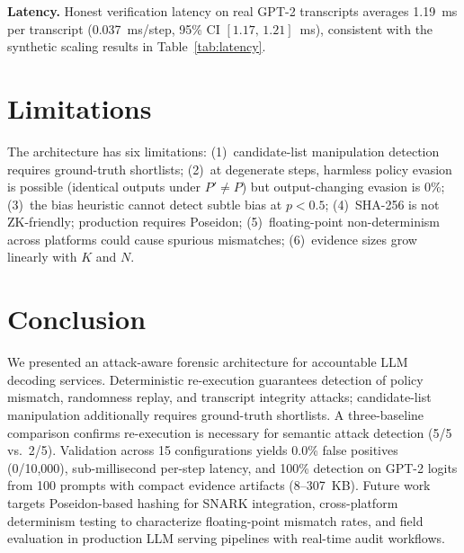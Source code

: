 \documentclass[conference]{IEEEtran}
\begin{document}
\textbf{Latency.} Honest verification latency on real GPT-2 transcripts averages 1.19~ms per transcript (0.037~ms/step, 95\% CI $[1.17,\, 1.21]$~ms), consistent with the synthetic scaling results in Table~\ref{tab:latency}.

\section{Limitations}\label{sec:limits}
The architecture has six limitations:
(1)~candidate-list manipulation detection requires ground-truth shortlists;
(2)~at degenerate steps, harmless policy evasion is possible (identical outputs under $P'\!\neq\!P$) but output-changing evasion is 0\%;
(3)~the bias heuristic cannot detect subtle bias at $p<0.5$;
(4)~SHA-256 is not ZK-friendly; production requires Poseidon;
(5)~floating-point non-determinism across platforms could cause spurious mismatches;
(6)~evidence sizes grow linearly with $K$ and $N$.

\section{Conclusion}
We presented an attack-aware forensic architecture for accountable LLM decoding services. Deterministic re-execution guarantees detection of policy mismatch, randomness replay, and transcript integrity attacks; candidate-list manipulation additionally requires ground-truth shortlists. A three-baseline comparison confirms re-execution is necessary for semantic attack detection (5/5 vs.\ 2/5). Validation across 15 configurations yields 0.0\% false positives (0/10{,}000), sub-millisecond per-step latency, and 100\% detection on GPT-2 logits from 100 prompts with compact evidence artifacts (8--307~KB). Future work targets Poseidon-based hashing for SNARK integration, cross-platform determinism testing to characterize floating-point mismatch rates, and field evaluation in production LLM serving pipelines with real-time audit workflows.

\balance


\end{document}
